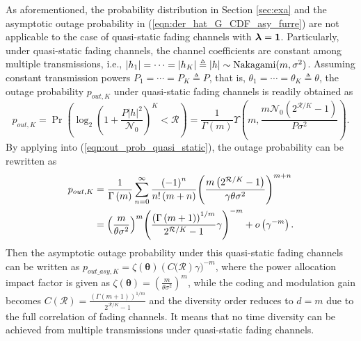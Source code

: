 \documentclass[12pt,onecolumn,draftcls]{IEEEtran}
\newcommand{\bs}{\boldsymbol}
\begin{document}
As aforementioned, the probability distribution in Section \ref{sec:exa} and the asymptotic outage probability in (\ref{eqn:der_hat_G_CDF_asy_furre}) are not applicable to the case of quasi-static fading channels with ${\boldsymbol{\lambda }} = {\bf 1}$. Particularly, under quasi-static fading channels, the channel coefficients are constant among multiple transmissions, i.e., $|h_1|=\cdots=|h_K| \triangleq |h| \sim {\rm Nakagami}(m,{\sigma}^2)$. Assuming constant transmission powers $P_1 = \cdots= P_K \triangleq P$, that is, $\theta_1 = \cdots= \theta_K \triangleq \theta$, the outage probability ${p_{out,K}}$ under quasi-static fading channels is readily obtained as
\begin{equation}\label{eqn:out_prob_quasi_static}
{p_{out,K}} = \Pr \left( {{{\log }_2}{{\left( {1 + \frac{{P}{{\left| {{h}} \right|}^2}}{\mathcal N_0}} \right)}^K} < \mathcal R} \right) = \frac{1}{{\Gamma \left( m \right)}}\Upsilon \left( {m,\frac{{m\mathcal N_0\left( {{2^{\mathcal R/K}} - 1} \right)}}{{{P}{\sigma}^2}}} \right).
\end{equation}
By applying \cite[Eq.8.354.1]{gradshteyn1965table} into (\ref{eqn:out_prob_quasi_static}), the outage probability can be rewritten as
\begin{align}\label{eqn:out_prob_quasi_asy}
{p_{out,K}}&= \frac{1}{{\Gamma \left( m \right)}}\sum\limits_{n = 0}^\infty  {\frac{{{{\left( { - 1} \right)}^n}}}{{n!\left( {m + n} \right)}}{{\left( {\frac{{m\left( {{2^{{\cal R}/K}} - 1} \right)}}{{\gamma {\theta{\sigma}^2}}}} \right)}^{m + n}}} \notag \\
&= {\left( {\frac{m}{{{\theta}{\sigma}^2}}} \right)^m}{\left( {\frac{{{{\left( {\Gamma \left( {m + 1} \right)} \right)}^{1/m}}}}{{{2^{{\cal R}/K}} - 1}}\gamma } \right)^{ - m}} + o\left( {{\gamma ^{ - m}}} \right).
\end{align}
Then the asymptotic outage probability under this quasi-static fading channels can be written as ${p_{out\_{asy},K}} = \zeta(\bs \theta) \left( C(\mathcal R \right ) \gamma)^{-m}$, where the power allocation impact factor is given as $\zeta(\bs \theta) = {\left( {\frac{m}{{{\theta{\sigma}^2}}}} \right)^{ m}}$, while the coding and modulation gain becomes $C(\mathcal R) = \frac{{{{\left( {\Gamma \left( {m + 1} \right)} \right)}^{1/m}}}}{{{2^{{\mathcal R}/K}} - 1}}$ and the diversity order reduces to $d=m$ due to the full correlation of fading channels. It means that no time diversity can be achieved from multiple transmissions under quasi-static fading channels.
\end{document}
